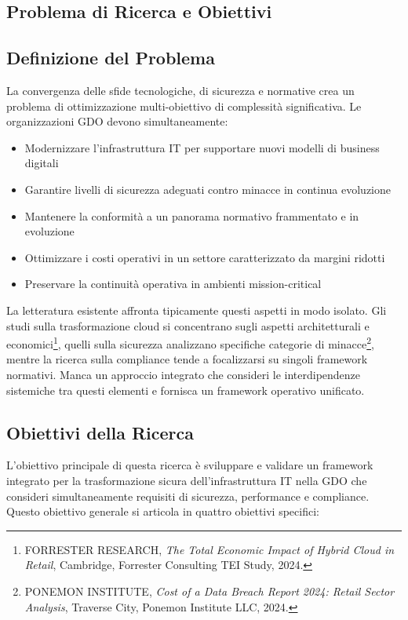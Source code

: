 \begin{bibunit}[IEEEtran]
\section{Problema di Ricerca e Obiettivi}

\subsection{Definizione del Problema}

La convergenza delle sfide tecnologiche, di sicurezza e normative crea un problema di ottimizzazione multi-obiettivo di complessità significativa. Le organizzazioni GDO devono simultaneamente:

\begin{itemize}
\item Modernizzare l'infrastruttura IT per supportare nuovi modelli di business digitali
\item Garantire livelli di sicurezza adeguati contro minacce in continua evoluzione
\item Mantenere la conformità a un panorama normativo frammentato e in evoluzione
\item Ottimizzare i costi operativi in un settore caratterizzato da margini ridotti
\item Preservare la continuità operativa in ambienti mission-critical
\end{itemize}

La letteratura esistente affronta tipicamente questi aspetti in modo isolato. Gli studi sulla trasformazione cloud si concentrano sugli aspetti architetturali e economici\footnote{FORRESTER RESEARCH, \textit{The Total Economic Impact of Hybrid Cloud in Retail}, Cambridge, Forrester Consulting TEI Study, 2024.}, quelli sulla sicurezza analizzano specifiche categorie di minacce\footnote{PONEMON INSTITUTE, \textit{Cost of a Data Breach Report 2024: Retail Sector Analysis}, Traverse City, Ponemon Institute LLC, 2024.}, mentre la ricerca sulla compliance tende a focalizzarsi su singoli framework normativi. Manca un approccio integrato che consideri le interdipendenze sistemiche tra questi elementi e fornisca un framework operativo unificato.

\subsection{Obiettivi della Ricerca}

L'obiettivo principale di questa ricerca è sviluppare e validare un framework integrato per la trasformazione sicura dell'infrastruttura IT nella GDO che consideri simultaneamente requisiti di sicurezza, performance e compliance. Questo obiettivo generale si articola in quattro obiettivi specifici:


\end{bibunit}
